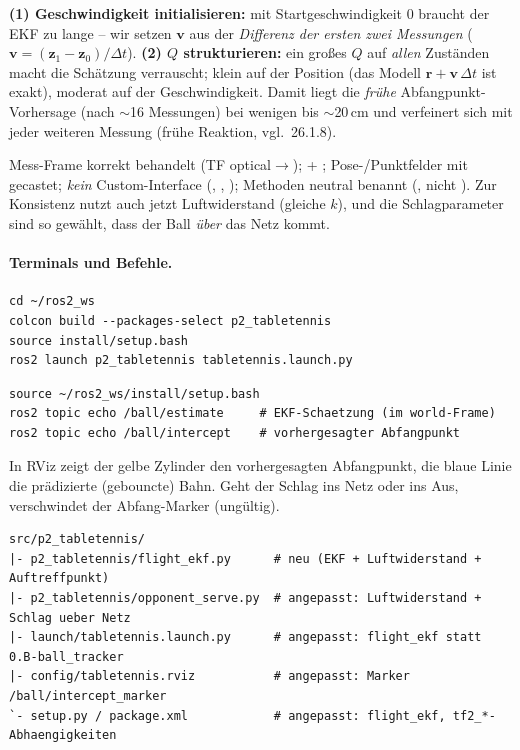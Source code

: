 \begin{infobox}[title={Zwei EKF-Stolpersteine, die wir live trafen}]
\textbf{(1) Geschwindigkeit initialisieren:} mit Startgeschwindigkeit $0$ braucht
der EKF zu lange -- wir setzen $\mathbf v$ aus der \emph{Differenz der ersten
zwei Messungen} ($\mathbf v=(\mathbf z_1-\mathbf z_0)/\Delta t$). \textbf{(2) $Q$
strukturieren:} ein großes $Q$ auf \emph{allen} Zuständen macht die Schätzung
verrauscht; klein auf der Position (das Modell $\mathbf r\!+\!\mathbf v\,\Delta t$
ist exakt), moderat auf der Geschwindigkeit. Damit liegt die \emph{frühe}
Abfangpunkt-Vorhersage (nach $\sim$16 Messungen) bei wenigen bis $\sim$20\,cm und
verfeinert sich mit jeder weiteren Messung (frühe Reaktion, vgl.\ 26.1.8).
\end{infobox}

\begin{infobox}[title={Checkliste 23.5/24.6 -- in Schritt 4 beachtet}]
Mess-Frame korrekt behandelt (TF optical$\rightarrow$);
 + ; Pose-/Punktfelder mit 
gecastet; \emph{kein} Custom-Interface (, ,
); Methoden neutral benannt (, nicht ).
Zur Konsistenz nutzt auch  jetzt Luftwiderstand (gleiche
$k$), und die Schlagparameter sind so gewählt, dass der Ball \emph{über} das Netz
kommt.
\end{infobox}

\paragraph{Terminals und Befehle.}
\begin{lstlisting}[style=bash,caption={Terminal 1 -- alles starten (jetzt mit flight\_ekf)}]
cd ~/ros2_ws
colcon build --packages-select p2_tabletennis
source install/setup.bash
ros2 launch p2_tabletennis tabletennis.launch.py
\end{lstlisting}
\begin{lstlisting}[style=bash,caption={Terminal 2 -- Schaetzung und Abfangpunkt mitlesen}]
source ~/ros2_ws/install/setup.bash
ros2 topic echo /ball/estimate     # EKF-Schaetzung (im world-Frame)
ros2 topic echo /ball/intercept    # vorhergesagter Abfangpunkt
\end{lstlisting}
\noindent In RViz zeigt der gelbe Zylinder den vorhergesagten Abfangpunkt, die
blaue Linie die prädizierte (gebouncte) Bahn. Geht der Schlag ins Netz oder ins
Aus, verschwindet der Abfang-Marker (ungültig).
\begin{lstlisting}[style=bash,caption={\code{ros2\_ws}-Delta nach Schritt 4 (\# neu / \# angepasst)}]
src/p2_tabletennis/
|- p2_tabletennis/flight_ekf.py      # neu (EKF + Luftwiderstand + Auftreffpunkt)
|- p2_tabletennis/opponent_serve.py  # angepasst: Luftwiderstand + Schlag ueber Netz
|- launch/tabletennis.launch.py      # angepasst: flight_ekf statt 0.B-ball_tracker
|- config/tabletennis.rviz           # angepasst: Marker /ball/intercept_marker
`- setup.py / package.xml            # angepasst: flight_ekf, tf2_*-Abhaengigkeiten
\end{lstlisting}

